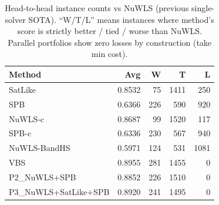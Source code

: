 \begin{table}[t]\centering\small
\caption{Head-to-head instance counts vs NuWLS (previous single-solver SOTA).
``W/T/L'' means instances where method's score is strictly better / tied / worse than NuWLS.
Parallel portfolios show zero losses by construction (take min cost).}
\label{tab:h2h}
\begin{tabular}{lrrrr}\toprule
\textbf{Method} & \textbf{Avg} & \textbf{W} & \textbf{T} & \textbf{L} \\\midrule
SatLike & 0.8532 & 75 & 1411 & 250 \\
SPB & 0.6366 & 226 & 590 & 920 \\
NuWLS-c & 0.8687 & 99 & 1520 & 117 \\
SPB-c & 0.6336 & 230 & 567 & 940 \\
NuWLS-BandHS & 0.5971 & 124 & 531 & 1081 \\
VBS & 0.8955 & 281 & 1455 & 0 \\
P2_NuWLS+SPB & 0.8852 & 226 & 1510 & 0 \\
P3_NuWLS+SatLike+SPB & 0.8920 & 241 & 1495 & 0 \\
\bottomrule
\end{tabular}
\end{table}

